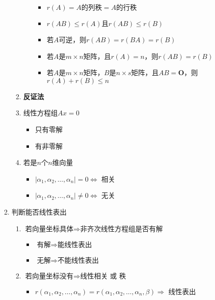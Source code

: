 \documentclass[a4paper,12pt]{article}
\begin{document}
\begin{enumerate}
\begin{enumerate}
\begin{enumerate}
\begin{itemize}
                    \item $r(A) = A\text{的列秩} = A\text{的行秩}$
                    \item $r(AB) \le r(A) \text{且} r(AB) \le r(B)$
                    \item 若$A$可逆，则$r(AB) = r(BA) = r(B)$
                    \item 若$A$是$m \times n$矩阵，且$r(A) = n$，则$r(AB) = r(B)$
                    \item 若$A$是$m \times n$矩阵，$B$是$n \times s$矩阵，且$AB = \mathbf{O}$，则$r(A) + r(B) \le n$
                \end{itemize}
            \end{enumerate}
            \item \textbf{反证法}
            \item 线性方程组$Ax = 0$
            \begin{itemize}
                \item 只有零解 \Leftrightarrow {}
                \item 有非零解 \Leftrightarrow {}
            \end{itemize}
            \item 若是$n$个$n$维向量
            \begin{itemize}
                \item $|\alpha_1, \alpha_2, \dots, \alpha_n| = 0 \Leftrightarrow$ 相关
                \item $|\alpha_1, \alpha_2, \dots, \alpha_n| \neq 0 \Leftrightarrow$ 无关
            \end{itemize}
        \end{enumerate}
        \item 判断能否线性表出
        \begin{enumerate}
            \item $\text{若向量坐标具体} \Rightarrow \text{非齐次线性方程组是否有解}$
            \begin{itemize}
                \item $\text{有解} \Rightarrow \text{能线性表出}$
                \item $\text{无解} \Rightarrow \text{不能线性表出}$
            \end{itemize}
            \item $\text{若向量坐标没有} \Rightarrow \text{线性相关 或 秩}$
            \begin{itemize}
                \item $r(\alpha_1, \alpha_2, \dots, \alpha_n) = r(\alpha_1, \alpha_2, \dots, \alpha_n, \beta) \Rightarrow$ 线性表出

\end{itemize}
\end{enumerate}
\end{enumerate}
\end{document}
